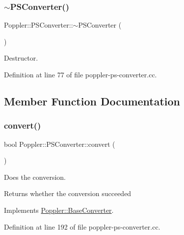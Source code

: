 \subsubsection{\texorpdfstring{$\sim$\+P\+S\+Converter()}{~PSConverter()}}
{\footnotesize\ttfamily Poppler\+::\+P\+S\+Converter\+::$\sim$\+P\+S\+Converter (\begin{DoxyParamCaption}{ }\end{DoxyParamCaption})}

Destructor. 

Definition at line 77 of file poppler-\/ps-\/converter.\+cc.



\subsection{Member Function Documentation}
\mbox{\label{class_poppler_1_1_p_s_converter_a106cc524ec1d73ab7f6bbb6cf1deede9}} 
\subsubsection{\texorpdfstring{convert()}{convert()}}
{\footnotesize\ttfamily bool Poppler\+::\+P\+S\+Converter\+::convert (\begin{DoxyParamCaption}{ }\end{DoxyParamCaption})\hspace{0.3cm}{\ttfamily [virtual]}}

Does the conversion.

\begin{DoxyReturn}{Returns}
whether the conversion succeeded 
\end{DoxyReturn}


Implements \hyperlink{class_poppler_1_1_base_converter_a272756d051ce3795a89772eaa93cadca}{Poppler\+::\+Base\+Converter}.



Definition at line 192 of file poppler-\/ps-\/converter.\+cc.

\mbox{\label{class_poppler_1_1_p_s_converter_ac52aec45730a525c2f4f7d9d142815ac}} 
